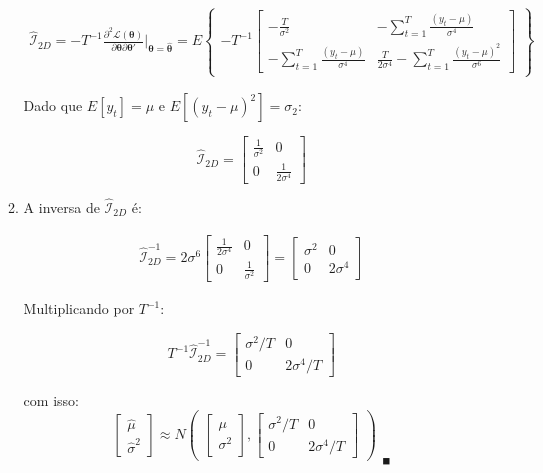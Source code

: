\begin{enumerate}
\begin{enumerate}
			
		\begin{align*}
			\mathscr{\hat{I}}_{2D}=-T^{-1}\frac{\partial^2 \mathscr{L}(\boldsymbol{\theta})}{\partial\boldsymbol{\theta}\partial\boldsymbol{\theta}'}\Bigg|_{\boldsymbol{\theta}=\hat{\boldsymbol{\theta}}}=E\begin{Bmatrix}-T^{-1}\begin{bmatrix}
				-\frac{T}{\sigma^2}&-\sum\limits_{t=1}^T\frac{(y_t-\mu)}{\sigma^4}\\
				-\sum\limits_{t=1}^T\frac{(y_t-\mu)}{\sigma^4}&\frac{T}{2\sigma^4}-\sum\limits_{t=1}^T\frac{(y_t-\mu)^2}{\sigma^6}
			\end{bmatrix}\end{Bmatrix}
		\end{align*}
	\pagebreak
	
	Dado que $E[y_t]=\mu$ e $E[(y_t-\mu)^2]=\sigma_2$:
	
			$$\mathscr{\hat{I}}_{2D}=\begin{bmatrix}
			\frac{1}{\sigma^2}&0\\
			0&\frac{1}{2\sigma^4}
			\end{bmatrix}$$
			
	\item %
	
	A inversa de  $\mathscr{\hat{I}}_{2D}$ é:
	
	\begin{align*}
		\mathscr{\hat{I}}_{2D}^{-1}={2\sigma^6}\begin{bmatrix}
		\frac{1}{2\sigma^4}	&0\\
			0&\frac{1}{\sigma^2}\end{bmatrix}
		=\begin{bmatrix}
			\sigma^2	&0\\
			0&2\sigma^4\end{bmatrix}
	\end{align*}

	Multiplicando por $T^{-1}$:
	
	$$T^{-1}\mathscr{\hat{I}}_{2D}^{-1}=\begin{bmatrix}
	\sigma^2/T	&0\\
	0&2\sigma^4/T\end{bmatrix}$$
	
	com isso: 
	$$\begin{bmatrix}
	\hat{\mu}\\
	\hat{\sigma}^2
	\end{bmatrix}\approx N \begin{pmatrix}
	\begin{bmatrix}
	\mu\\
	\sigma^2
	\end{bmatrix},
	\begin{bmatrix}
	\sigma^2/T	&0\\
	0&2\sigma^4/T\end{bmatrix}
	\end{pmatrix}_{\;\;\blacksquare}$$
	\end{enumerate}
	
\end{enumerate}